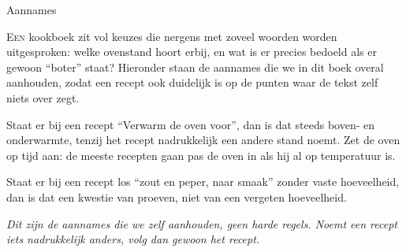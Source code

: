 \vspace*{0.4cm}
{\handfont\fontsize{60}{60}\selectfont\color{terracotta}Aannames\par}
\vspace{8pt}{\color{terracotta}\rule{2.6cm}{0.5pt}\;\raisebox{-0.2ex}{$\scriptstyle\blacklozenge$}}\par
\vspace{1.4em}

\lettrine{E}{en} kookboek zit vol keuzes die nergens met zoveel woorden
worden uitgesproken: welke ovenstand hoort erbij, en wat is er precies
bedoeld als er gewoon ``boter'' staat? Hieronder staan de aannames die we
in dit boek overal aanhouden, zodat een recept ook duidelijk is op de
punten waar de tekst zelf niets over zegt.

Staat er bij een recept ``Verwarm de oven voor'', dan is dat steeds
boven- en onderwarmte, tenzij het recept nadrukkelijk een andere stand
noemt. Zet de oven op tijd aan: de meeste recepten gaan pas de oven in als
hij al op temperatuur is.

\begin{ingredients}
\end{ingredients}
Staat er bij een recept los ``zout en peper, naar smaak'' zonder vaste
hoeveelheid, dan is dat een kwestie van proeven, niet van een vergeten
hoeveelheid.

\vspace{0.6em}
{\footnotesize\itshape\color{inkfaint}Dit zijn de aannames die we zelf
aanhouden, geen harde regels. Noemt een recept iets nadrukkelijk anders,
volg dan gewoon het recept.\par}
